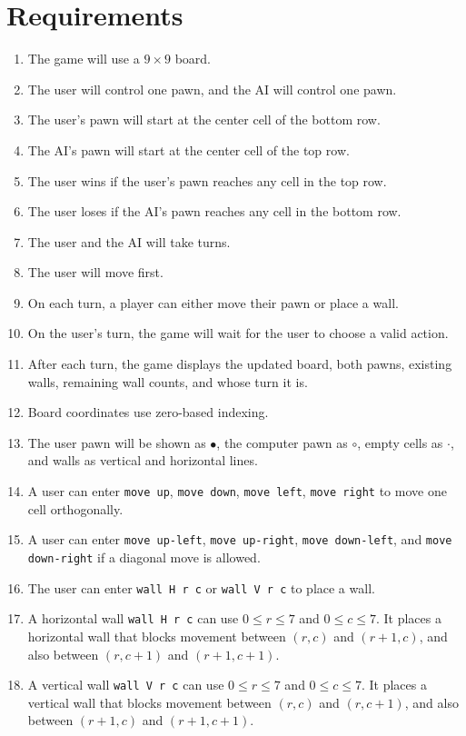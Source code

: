 \documentclass{article}
\begin{document}
\section{Requirements}
\begin{enumerate}
	\item The game will use a $9\times 9$ board.
	\item The user will control one pawn, and the AI will control one pawn.
	\item The user's pawn will start at the center cell of the bottom row.
	\item The AI's pawn will start at the center cell of the top row.
	\item The user wins if the user's pawn reaches any cell in the top row.
	\item The user loses if the AI's pawn reaches any cell in the bottom row.
	\item The user and the AI will take turns.
	\item The user will move first.
	\item On each turn, a player can either move their pawn or place a wall.
	\item On the user's turn, the game will wait for the user to choose a valid action.
	\item After each turn, the game displays the updated board, both pawns, existing walls, remaining wall counts, and whose turn it is.
	\item Board coordinates use zero-based indexing.
	\item The user pawn will be shown as $\bullet$, the computer pawn as $\circ$, empty cells as $\cdot$, and walls as vertical and horizontal lines.
	\item A user can enter \texttt{move up}, \texttt{move down}, \texttt{move left}, \texttt{move right} to move one cell orthogonally.
	\item A user can enter \texttt{move up-left}, \texttt{move up-right}, \texttt{move down-left}, and \texttt{move down-right} if a diagonal move is allowed.
	\item The user can enter \texttt{wall H r c} or \texttt{wall V r c} to place a wall.
	\item A horizontal wall \texttt{wall H r c} can use $0 \le r \le 7$ and $0 \le c \le 7$. It places a horizontal wall that blocks movement between $(r,c)$ and $(r+1,c)$, and also between $(r,c+1)$ and $(r+1,c+1)$.
	\item A vertical wall \texttt{wall V r c} can use $0 \le r \le 7$ and $0 \le c \le 7$. It places a vertical wall that blocks movement between $(r,c)$ and $(r,c+1)$, and also between $(r+1,c)$ and $(r+1,c+1)$.

\end{enumerate}
\end{document}
